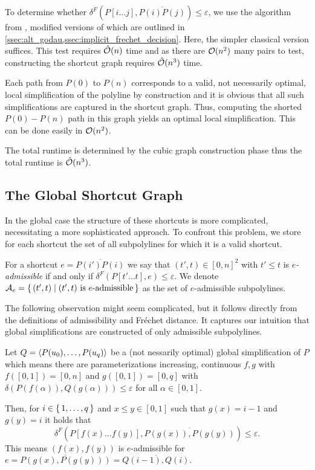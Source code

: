 To determine whether \(\delta^F(P[i \dots j], \overline{P(i)P(j)}) \leq \varepsilon\), we use the algorithm from \citeauthor{computing_the_frechet_distance_between_two_polygonal_curves}, modified versions of which are outlined in \cref{ssec:alt_godau,ssec:implicit_frechet_decision}. Here, the simpler classical version suffices. This test requires \(\hat{\mathcal{O}}(n)\) time and as there are \(\mathcal{O}(n^2)\) many pairs to test, constructing the shortcut graph requires \(\hat{\mathcal{O}}(n^3)\) time.

Each path from \(P(0)\) to \(P(n)\) corresponds to a valid, not necessarily optimal, local simplification of the polyline by construction and it is obvious that all such simplifications are captured in the shortcut graph. Thus, computing the shorted \(P(0)-P(n)\) path in this graph yields an optimal local simplification. This can be done easily in \(\mathcal{O}(n^2)\).

The total runtime is determined by the cubic graph construction phase thus the total runtime is \(\hat{\mathcal{O}}(n^3)\).

\subsection{The Global Shortcut Graph}
In the global case the structure of these shortcuts is more complicated, necessitating a more sophisticated approach. To confront this problem, we store for each shortcut the set of all subpolylines for which it is a valid shortcut. 

\begin{definition}
  For a shortcut \(e = \overline{P(i')P(i)}\) we say that \((t', t) \in [0, n]^2\) with \(t' \leq t\) is \emph{\(e\)-admissible} if and only if \(\delta^F(P[t' \dots t], e) \leq \varepsilon\). We denote \(\mathcal{A}_e = \set{(t', t) \mid (t', t) \textrm{ is } e\textrm{-admissible}}\) as the set of \(e\)-admissible subpolylines.
\end{definition}

The following observation might seem complicated, but it follows directly from the definitions of admissibility and Fréchet distance. It captures our intuition that global simplifications are constructed of only admissible subpolylines.

\begin{observation}
	Let \(Q=\left\langle P(u_0), \dots, P(u_q)\right\rangle\) be a (not nessarily optimal) global simplification of \(P\) which means there are parameterizations increasing, continuous \(f, g\) with \(f([0, 1]) = [0, n]\) and \(g([0,1]) = [0, q]\) with \(\delta(P(f(\alpha)), Q(g(\alpha))) \leq \varepsilon\) for all \(\alpha \in [0, 1]\).

	Then, for \(i \in \set{1, \dots, q}\) and \(x \leq y \in [0, 1]\) such that \(g(x) = i - 1\) and \(g(y) = i\) it holds that 
	\[\delta^F(P[f(x) \dots f(y)], \overline{P(g(x)), P(g(y))}) \leq \varepsilon.\]
	This means \((f(x), f(y))\) is \(e\)-admissible for \(e = \overline{P(g(x), P(g(y)))} = \overline{Q(i-1), Q(i)}\).
\end{observation}

